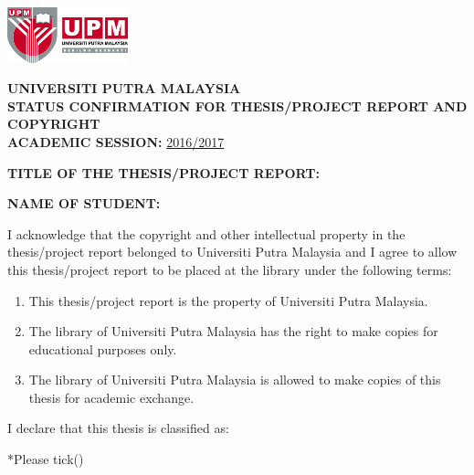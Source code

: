 \begin{titlepage}
\small
\begin{center}
\includegraphics[angle=0,width=3.5cm]{upm.jpeg}
\end{center}

\begin{center}
{\bf \textbf{UNIVERSITI PUTRA MALAYSIA \\ STATUS CONFIRMATION FOR THESIS/PROJECT REPORT AND COPYRIGHT\\ACADEMIC SESSION:}} {\underline{2016/2017}}
\end{center}

{\bf \textbf{TITLE OF THE THESIS/PROJECT REPORT:}}\\
\underline{  {\textsc{\thesistitle}}          }



{\bf{NAME OF STUDENT:}} \underline{\authorname}
\begin{singlespace}
I acknowledge that the copyright and other intellectual property in the thesis/project report belonged to Universiti Putra Malaysia and I agree to allow this thesis/project report to be placed at the library under the following terms:

\begin{enumerate}
\item This thesis/project report is the property of Universiti Putra Malaysia.
\item The library of Universiti Putra Malaysia has the right to make copies for educational purposes only.
\item The library of Universiti Putra Malaysia is allowed to make copies of this thesis for academic exchange.
\end{enumerate}

I declare that this thesis is classified as:

*Please tick(\checkmark)




\end{singlespace}
\end{titlepage}
